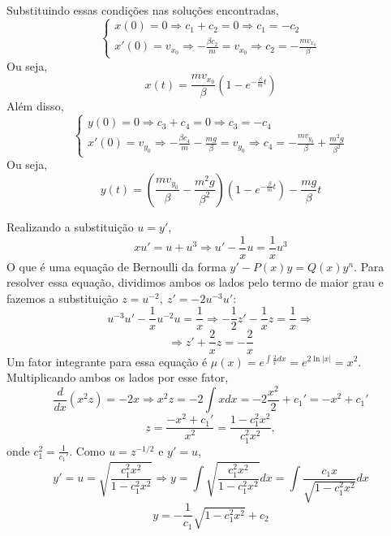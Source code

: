 \documentclass[oneside,12pt,a4paper]{report}
\begin{document}
\begin{resolucao}
\begin{align*}
        \end{align*}
        Substituindo essas condições nas soluções encontradas,
        \[\begin{cases}
            x(0)=0\Rightarrow c_1+c_2=0\Rightarrow c_1=-c_2\\
            x'(0)=v_{x_0}\Rightarrow -\frac{\beta c_2}{m}=v_{x_0}\Rightarrow c_2=-\frac{mv_{x_0}}{\beta}
        \end{cases}\]
        Ou seja,
        \[\boxed{x(t)=\frac{mv_{x_0}}{\beta}\left(1-e^{-\frac{\beta}{m}t}\right)}\]
        Além disso,
        \[\begin{cases}
            y(0)=0\Rightarrow c_3+c_4=0\Rightarrow c_3=-c_4\\
            x'(0)=v_{y_0}\Rightarrow -\frac{\beta c_4}{m}-\frac{mg}{\beta}=v_{y_0}\Rightarrow c_4=-\frac{mv_{y_0}}{\beta}+\frac{m^2g}{\beta^2}
        \end{cases}\]
        Ou seja,
        \[\boxed{y(t)=\left(\frac{mv_{y_0}}{\beta}-\frac{m^2g}{\beta^2}\right)\left(1-e^{-\frac{\beta}{m}t}\right)-\frac{mg}{\beta}t}\]
    \end{resolucao}

    \begin{resolucao}
        Realizando a substituição $u=y'$,
        \[xu'=u+u^3\Rightarrow u'-\frac{1}{x}u=\frac{1}{x}u^3\]
        O que é uma equação de Bernoulli da forma $y'-P(x)y=Q(x)y^n$. Para resolver essa equação, dividimos ambos os lados pelo termo de maior grau e fazemos a substituição $z=u^{-2},~z'=-2u^{-3}u'$:
        \[u^{-3}u'-\frac{1}{x}u^{-2}u=\frac{1}{x}\Rightarrow -\frac{1}{2}z'-\frac{1}{x}z=\frac{1}{x}\Rightarrow\]
        \[\Rightarrow z'+\frac{2}{x}z=-\frac{2}{x}\]
        Um fator integrante para essa equação é $\mu(x)=e^{\int \frac{2}{x}dx}=e^{2\ln|x|}=x^2$. Multiplicando ambos os lados por esse fator,
        \[\frac{d}{dx}\left(x^2z\right)=-2x\Rightarrow x^2z=-2\int x dx=-2\frac{x^2}{2}+c_1'=-x^2+c_1'\]
        \[z=\frac{-x^2+c_1'}{x^2}=\frac{1-c_1^2x^2}{c_1^2x^2},\]
        onde $c_1^2=\frac{1}{c_1'}$. Como $u=z^{-1/2}$ e $y'=u$,
        \[y'=u=\sqrt{\frac{c_1^2x^2}{1-c_1^2x^2}}\Rightarrow y=\int\sqrt{\frac{c_1^2x^2}{1-c_1^2x^2}}dx=\int\frac{c_1x}{\sqrt{1-c_1^2x^2}}dx\]
        \[\boxed{y=-\frac{1}{c_1}\sqrt{1-c_1^2x^2}+c_2}\]
    \end{resolucao}
\end{document}
